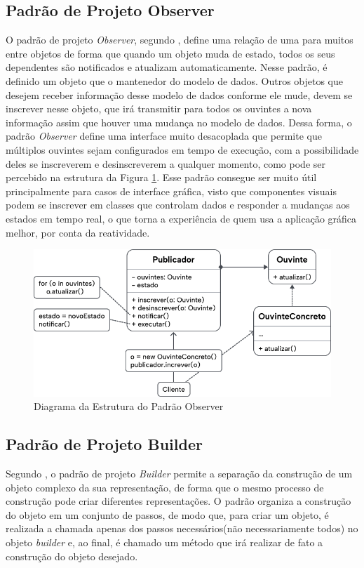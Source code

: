 \documentclass[12pt, %
openright, 
oneside, %
a4paper,    %
brazil]{facom-ufu-abntex2}
\begin{document}
\subsection{Padrão de Projeto Observer}

O padrão de projeto \textit{Observer}, segundo , define uma relação de uma para muitos entre objetos de forma que quando um objeto muda de estado, todos os seus dependentes são notificados e atualizam automaticamente. Nesse padrão, é definido um objeto que o mantenedor do modelo de dados. Outros objetos que desejem receber informação desse modelo de dados conforme ele mude, devem se inscrever nesse objeto, que irá transmitir para todos os ouvintes a nova informação assim que houver uma mudança no modelo de dados. Dessa forma, o padrão \textit{Observer} define uma interface muito desacoplada que permite que múltiplos ouvintes sejam configurados em tempo de execução, com a possibilidade deles se inscreverem e desinscreverem a qualquer momento, como pode ser percebido na estrutura da Figura \ref{fig:observer_diagram}. Esse padrão consegue ser muito útil principalmente para casos de interface gráfica, visto que componentes visuais podem se inscrever em classes que controlam dados e responder a mudanças aos estados em tempo real, o que torna a experiência de quem usa a aplicação gráfica melhor, por conta da reatividade.

\begin{figure}[ht]
    \centering
    \includegraphics[width=.65\textwidth]{figures/design_patterns/observer_diagram.png}
    \caption{Diagrama da Estrutura do Padrão Observer}
    \label{fig:observer_diagram}
\end{figure}

\subsection{Padrão de Projeto Builder}

Segundo , o padrão de projeto \textit{Builder} permite a separação da construção de um objeto complexo da sua representação, de forma que o mesmo processo de construção pode criar diferentes representações. O padrão organiza a construção do objeto em um conjunto de passos, de modo que, para criar um objeto, é realizada a chamada apenas dos passos necessários(não necessariamente todos) no objeto \textit{builder} e, ao final, é chamado um método que irá realizar de fato a construção do objeto desejado.
\end{document}
